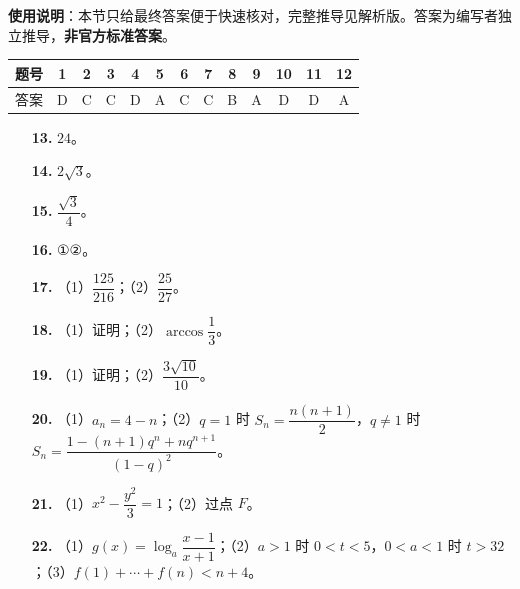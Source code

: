 
\begin{gknotice}
\textbf{使用说明}：本节只给最终答案便于快速核对，完整推导见解析版。答案为编写者独立推导，\textbf{非官方标准答案}。
\end{gknotice}

\begin{center}\begin{tabular}{ccccccccccccc}
\toprule
题号 & 1 & 2 & 3 & 4 & 5 & 6 & 7 & 8 & 9 & 10 & 11 & 12 \\
\midrule
答案 & D & C & C & D & A & C & C & B & A & D & D & A \\
\bottomrule
\end{tabular}\end{center}

\begin{itemize}[leftmargin=2.6em]
  \item[\textbf{13.}] $24$。
  \item[\textbf{14.}] $2\sqrt3$。
  \item[\textbf{15.}] $\dfrac{\sqrt3}4$。
  \item[\textbf{16.}] ①②。
\end{itemize}

\begin{itemize}[leftmargin=2.6em]
  \item[\textbf{17.}] （1）$\dfrac{125}{216}$；（2）$\dfrac{25}{27}$。
  \item[\textbf{18.}] （1）证明；（2）$\arccos\dfrac13$。
  \item[\textbf{19.}] （1）证明；（2）$\dfrac{3\sqrt{10}}{10}$。
  \item[\textbf{20.}] （1）$a_n=4-n$；（2）$q=1$ 时 $S_n=\dfrac{n(n+1)}2$，$q\neq1$ 时 $S_n=\dfrac{1-(n+1)q^n+nq^{n+1}}{(1-q)^2}$。
  \item[\textbf{21.}] （1）$x^2-\dfrac{y^2}3=1$；（2）过点 $F$。
  \item[\textbf{22.}] （1）$g(x)=\log_a\dfrac{x-1}{x+1}$；（2）$a>1$ 时 $0<t<5$，$0<a<1$ 时 $t>32$；（3）$f(1)+\cdots+f(n)<n+4$。
\end{itemize}
